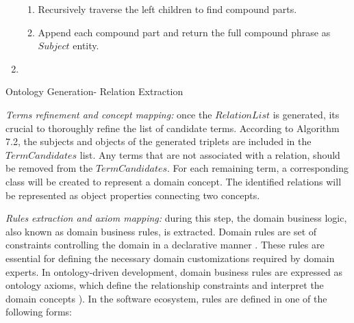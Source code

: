 \begin{algorithm}
\begin{enumerate}
{\begin{enumerate}
	     \item
	       Recursively traverse the left children to find compound parts.
	     \item
	       Append each compound part and return the full compound phrase as
	       \(Subject\) entity.
	     \end{enumerate}
	     }\label{endfor}
	     
	     
	     \item
	     	      \label{endfor}
	     
	\end{enumerate}
	
\caption{Ontology Generation- Relation Extraction}\label{alg:onto-re}
\end{algorithm}

\emph{Terms refinement and concept mapping:} once the \(RelationList\)
is generated, it\textquotesingle s crucial to thoroughly refine the list
of candidate terms. According to Algorithm 7.2,
the subjects and objects of the generated triplets are included in the
\(TermCandidates\) list. Any terms that are not associated with a
relation, should be removed from the \(TermCandidates\). For each
remaining term, a corresponding class will be created to represent a
domain concept. The identified relations will be represented as object
properties connecting two concepts.

\emph{Rules extraction and axiom mapping:} during this step, the domain
business logic, also known as domain business rules, is extracted.
Domain rules are set of constraints controlling the domain in a
declarative manner \autocite{Kalibatiene2010}. These rules are
essential for defining the necessary domain customizations required by
domain experts. In ontology-driven development, domain business rules
are expressed as ontology axioms, which define the relationship
constraints and interpret the domain concepts \autocite{DeFreitas2022}). In the software ecosystem, rules are defined in one of the
following forms:

